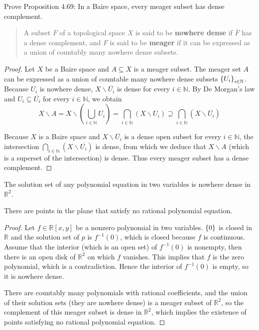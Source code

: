 \begin{exercise}{4.70}
	Prove Proposition 4.69: In a Baire space, every meager subset has dense complement.
\end{exercise}

\begin{quote}
	A subset $F$ of a topological space $X$ is said to be \textbf{nowhere dense} if $\overline{F}$ has a dense complement, and $F$ is said to be \textbf{meager} if it can be expressed as a union of countably many nowhere dense subsets.
\end{quote}

\begin{proof}
	Let $X$ be a Baire space and $A\subseteq X$ is a meager subset. The meager set $A$ can be expressed as a union of countable many nowhere dense subsets $\left\{{U_{i}}\right\}_{i\in\mathbb{N}}$. Because $U_{i}$ is nowhere dense, $X\smallsetminus\overline{U_{i}}$ is dense for every $i\in\mathbb{N}$. By De Morgan's law and $U_{i}\subseteq \overline{U_{i}}$ for every $i\in \mathbb{N}$, we obtain
	\begin{equation*}
		X\smallsetminus A = X\smallsetminus \left(\bigcup_{i\in\mathbb{N}}U_{i}\right) = \bigcap_{i\in\mathbb{N}}(X\smallsetminus U_{i}) \supseteq \bigcap_{i\in\mathbb{N}}(X\smallsetminus \overline{U_{i}})
	\end{equation*}

	Because $X$ is a Baire space and $X\smallsetminus \overline{U_{i}}$ is a dense open subset for every $i\in\mathbb{N}$, the intersection $\bigcap_{i\in\mathbb{N}} (X\smallsetminus \overline{U_{i}})$ is dense, from which we deduce that $X\smallsetminus A$ (which is a superset of the intersection) is dense. Thus every meager subset has a dense complement.
\end{proof}

\begin{example}{4.71}
	The solution set of any polynomial equation in two variables is nowhere dense in $\mathbb{R}^{2}$.

	There are points in the plane that satisfy no rational polynomial equation.
\end{example}

\begin{proof}
	Let $f \in \mathbb{R}[x, y]$ be a nonzero polynomial in two variables. $\left\{{0}\right\}$ is closed in $\mathbb{R}$ and the solution set of $p$ is $f^{-1}(0)$, which is closed because $f$ is continuous. Assume that the interior (which is an open set) of $f^{-1}(0)$ is nonempty, then there is an open disk of $\mathbb{R}^{2}$ on which $f$ vanishes. This implies that $f$ is the zero polynomial, which is a contradiction. Hence the interior of $f^{-1}(0)$ is empty, so it is nowhere dense.

	There are countably many polynomials with rational coefficients, and the union of their solution sets (they are nowhere dense) is a meager subset of $\mathbb{R}^{2}$, so the complement of this meager subset is dense in $\mathbb{R}^{2}$, which implies the existence of points satisfying no rational polynomial equation.
\end{proof}

